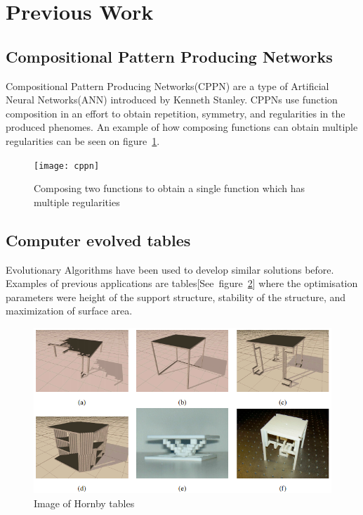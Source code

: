 \section{Previous Work}

\subsection{Compositional Pattern Producing Networks}
\label{sec:cppn}
Compositional Pattern Producing Networks(CPPN) are a type of Artificial Neural Networks(ANN) introduced by Kenneth Stanley\cite{Stanley2007}.
CPPNs use function composition in an effort to obtain repetition, symmetry, and regularities in the produced phenomes.
An example of how composing functions can obtain multiple regularities can be seen on figure~\ref{fig:cppn}.
\begin{figure}[ht]
\centering
\texttt{[image: cppn]}
\caption{Composing two functions to obtain a single function which has multiple regularities \cite{Stanley2007}}
\label{fig:cppn}
\end{figure}

\subsection{Computer evolved tables}
Evolutionary Algorithms have been used to develop similar solutions before. Examples of previous  applications are tables[See~figure~\ref{fig:hornby_tables}] where the optimisation parameters were height of the support structure, stability of the structure, and maximization of surface area.
\begin{figure}[ht]
\includegraphics[scale=.6]{content/img/tables}
\caption{Image of Hornby tables\cite{paper:ev4}}
\label{fig:hornby_tables}
\end{figure}

